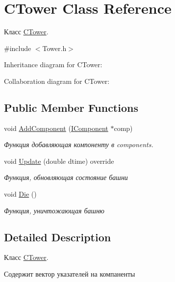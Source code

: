 \hypertarget{classCTower}{}\section{C\+Tower Class Reference}
\label{classCTower}


Класс \hyperlink{classCTower}{C\+Tower}.  




{\ttfamily \#include $<$Tower.\+h$>$}



Inheritance diagram for C\+Tower\+:


Collaboration diagram for C\+Tower\+:
\subsection*{Public Member Functions}
\begin{DoxyCompactItemize}
\item 
void \hyperlink{classCTower_aaabd89603fc2b72be4d42a30e6a6adff}{Add\+Component} (\hyperlink{classIComponent}{I\+Component} $\ast$comp)
\begin{DoxyCompactList}\small\item\em Функция добавляющая компоненту в components. \end{DoxyCompactList}\item 
void \hyperlink{classCTower_a90009dda4be1e5e20d37a57dc8aa068b}{Update} (double dtime) override
\begin{DoxyCompactList}\small\item\em Функция, обновляющая состояние башни \end{DoxyCompactList}\item 
void \hyperlink{classCTower_a6220e6e1dd92a3818426c85618f5470d}{Die} ()\hypertarget{classCTower_a6220e6e1dd92a3818426c85618f5470d}{}\label{classCTower_a6220e6e1dd92a3818426c85618f5470d}

\begin{DoxyCompactList}\small\item\em Функция, уничтожающая башню \end{DoxyCompactList}\end{DoxyCompactItemize}


\subsection{Detailed Description}
Класс \hyperlink{classCTower}{C\+Tower}. 

Содержит вектор указателей на компаненты 

